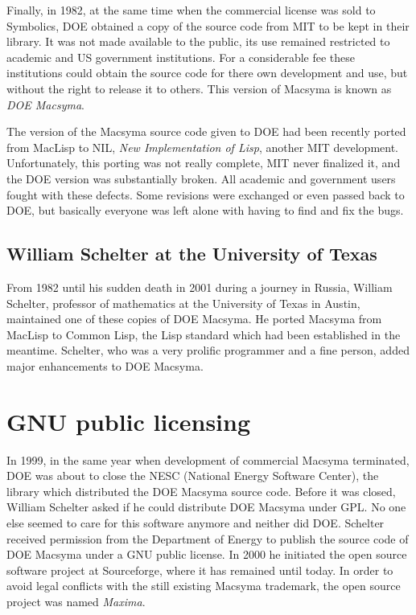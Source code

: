 \documentclass[../Maxima_Workbook.tex]{subfiles}
\begin{document}
\lz Finally, in 1982, at the same time when the commercial license was sold to Symbolics, DOE obtained a copy of the source code from MIT to be kept in their library. It was not made available to the public, its use remained restricted to academic and US government institutions. For a considerable fee these institutions could obtain the source code for there own development and use, but without the right to release it to others. This version of Macsyma is known as \emph{DOE Macsyma}. 

\lz The version of the Macsyma source code given to DOE had been recently ported from MacLisp to NIL, \emph{New Implementation of Lisp}, another MIT development. Unfortunately, this porting was not really complete, MIT never finalized it, and the DOE version was substantially broken. All academic and government users fought with these defects. Some revisions were exchanged or even passed back to DOE, but basically everyone was left alone with having to find and fix the bugs.

\subsection{William Schelter at the University of Texas}

From 1982 until his sudden death in 2001 during a journey in Russia, William Schelter, professor of mathematics at the University of Texas in Austin, maintained one of these copies of DOE Macsyma. He ported Macsyma from MacLisp to Common Lisp, the Lisp standard which had been established in the meantime. Schelter, who was a very prolific programmer and a fine person, added major enhancements to DOE Macsyma.

\section{GNU public licensing}

In 1999, in the same year when development of commercial Macsyma terminated, DOE was about to close the NESC (National Energy Software Center), the library which distributed the DOE Macsyma source code. Before it was closed, William Schelter asked if he could distribute DOE Macsyma under GPL. No one else seemed to care for this software anymore and neither did DOE. Schelter received permission from the Department of Energy to publish the source code of DOE Macsyma under a GNU public license. In 2000 he initiated the open source software project at Sourceforge, where it has remained until today. In order to avoid legal conflicts with the still existing Macsyma trademark, the open source project was named \emph{Maxima}.
\end{document}
